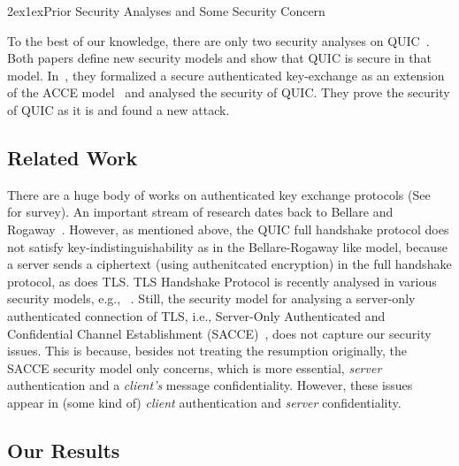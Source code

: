 \documentclass[11pt,a4j]{jarticle}
\makeatletter
\renewcommand{\section}{\@startsection{section}{1}{\z@}%
{2ex}{1ex}{\reset@font\large\bfseries}}%
\makeatother
\begin{document}
\section{Prior Security Analyses and Some Security Concern}

To the best of our knowledge, there are only two security analyses on QUIC~\cite{FG14:QUIC,LJBN15:QUIC}.
Both papers define new security models and show that QUIC is secure in that model.
In~\cite{LJBN15:QUIC}, they formalized a secure authenticated key-exchange
as an extension of the ACCE model~\cite{JKSS12:ACCE} and analysed
the security of QUIC.
They prove the security of QUIC as it is and found a new attack.


\subsection{Related Work} \label{sec:Related Work}
There are a huge body of works on authenticated key exchange protocols
(See~\cite{CK01:AKE} for survey).
An important stream of research dates back to Bellare and Rogaway~\cite{BR93:AKE}.
However, as mentioned above,
the QUIC full handshake protocol does not satisfy key-indistinguishability as in the Bellare-Rogaway like model, because a server sends a ciphertext (using authenitcated encryption) in the full handshake protocol, as does TLS.
TLS Handshake Protocol is recently analysed in various security models, e.g., ~\cite{JKSS12:ACCE,KPW13:SACCE,FS13:ACCE,GKS13:RACCE,BDKSS14:SSH,BFKPSB14:TLS}.
Still,
the security model for analysing a server-only authenticated connection of TLS,
i.e., Server-Only Authenticated and Confidential Channel Establishment
(SACCE)~\cite{KPW13:SACCE}, does not capture our security issues.
This is because, besides not treating the resumption originally,
the SACCE security model only concerns, which is more essential,
\textit{server} authentication and a \textit{client's} message confidentiality.
However, these issues appear in (some kind of) \textit{client} authentication
and \textit{server} confidentiality.

\subsection{Our Results} \label{sec:proposal}
\end{document}
